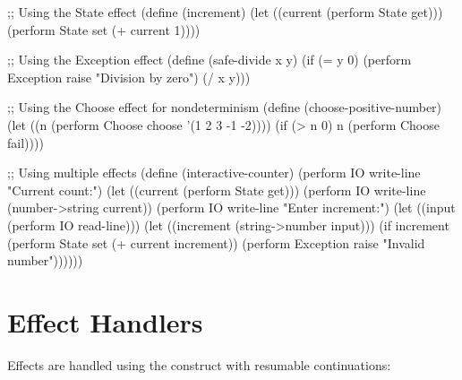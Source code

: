 \begin{example}
\begin{lambdustcode}
;; Using the State effect
(define (increment)
  (let ((current (perform State get)))
    (perform State set (+ current 1))))

;; Using the Exception effect
(define (safe-divide x y)
  (if (= y 0)
      (perform Exception raise "Division by zero")
      (/ x y)))

;; Using the Choose effect for nondeterminism
(define (choose-positive-number)
  (let ((n (perform Choose choose '(1 2 3 -1 -2))))
    (if (> n 0) 
        n
        (perform Choose fail))))

;; Using multiple effects  
(define (interactive-counter)
  (perform IO write-line "Current count:")
  (let ((current (perform State get)))
    (perform IO write-line (number->string current))
    (perform IO write-line "Enter increment:")
    (let ((input (perform IO read-line)))
      (let ((increment (string->number input)))
        (if increment
            (perform State set (+ current increment))
            (perform Exception raise "Invalid number"))))))
\end{lambdustcode}
\end{example}

\section{Effect Handlers}
\label{sec:effect-handlers}


Effects are handled using the  construct with resumable continuations:

\begin{grammar}
\\
\\
\end{grammar}

